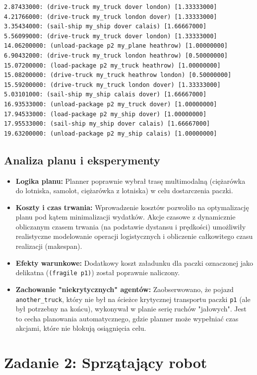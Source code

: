 \documentclass[11pt,a4paper]{article}
\begin{document}
\begin{lstlisting}[caption=Fragment wygenerowanego planu dla Zadania 1, label=lst:plan_task1, basicstyle=\ttfamily\scriptsize, breaklines=true]
2.87433000: (drive-truck my_truck dover london) [1.33333000]
4.21766000: (drive-truck my_truck london dover) [1.33333000]
3.35434000: (sail-ship my_ship dover calais) [1.66667000]
5.56099000: (drive-truck my_truck dover london) [1.33333000]
14.06200000: (unload-package p2 my_plane heathrow) [1.00000000]
6.90432000: (drive-truck my_truck london heathrow) [0.50000000]
15.07200000: (load-package p2 my_truck heathrow) [1.00000000]
15.08200000: (drive-truck my_truck heathrow london) [0.50000000]
15.59200000: (drive-truck my_truck london dover) [1.33333000]
5.03101000: (sail-ship my_ship calais dover) [1.66667000]
16.93533000: (unload-package p2 my_truck dover) [1.00000000]
17.94533000: (load-package p2 my_ship dover) [1.00000000]
17.95533000: (sail-ship my_ship dover calais) [1.66667000]
19.63200000: (unload-package p2 my_ship calais) [1.00000000]
\end{lstlisting}

\subsection{Analiza planu i eksperymenty}
\begin{itemize}
  \item \textbf{Logika planu:} Planner poprawnie wybrał trasę multimodalną (ciężarówka do lotniska, samolot, ciężarówka z lotniska) w celu dostarczenia paczki.
  \item \textbf{Koszty i czas trwania:} Wprowadzenie kosztów pozwoliło na optymalizację planu pod kątem minimalizacji wydatków. Akcje czasowe z dynamicznie obliczanym czasem trwania (na podstawie dystansu i prędkości) umożliwiły realistyczne modelowanie operacji logistycznych i obliczenie całkowitego czasu realizacji (makespan).
  \item \textbf{Efekty warunkowe:} Dodatkowy koszt załadunku dla paczki oznaczonej jako delikatna (\texttt{(fragile p1)}) został poprawnie naliczony.
  \item \textbf{Zachowanie "niekrytycznych" agentów:} Zaobserwowano, że pojazd \texttt{another\_truck}, który nie był na ścieżce krytycznej transportu paczki \texttt{p1} (ale był potrzebny na końcu), wykonywał w planie serię ruchów "jałowych". Jest to cecha planowania automatycznego, gdzie planner może wypełniać czas akcjami, które nie blokują osiągnięcia celu.
\end{itemize}

\section{Zadanie 2: Sprzątający robot}
\end{document}
